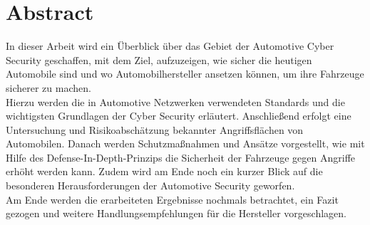 \chapter*{Abstract}
In dieser Arbeit wird ein Überblick über das Gebiet der Automotive Cyber Security geschaffen, mit dem Ziel, aufzuzeigen, wie sicher die heutigen Automobile sind und wo Automobilhersteller ansetzen können, um ihre Fahrzeuge sicherer zu machen.\\
Hierzu werden die in Automotive Netzwerken verwendeten Standards und die wichtigsten Grundlagen der Cyber Security erläutert. Anschließend erfolgt eine Untersuchung und Risikoabschätzung bekannter Angriffsflächen von Automobilen. Danach werden Schutzmaßnahmen und Ansätze vorgestellt, wie mit Hilfe des Defense-In-Depth-Prinzips die Sicherheit der Fahrzeuge gegen Angriffe erhöht werden kann. Zudem wird am Ende noch ein kurzer Blick auf die besonderen Herausforderungen der Automotive Security geworfen.\\
Am Ende werden die erarbeiteten Ergebnisse nochmals betrachtet, ein Fazit gezogen und weitere Handlungsempfehlungen für die Hersteller vorgeschlagen.
